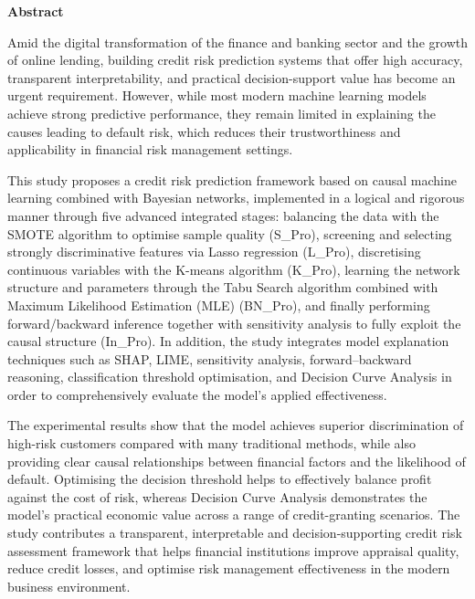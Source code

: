 \clearpage
{}
\vspace*{1cm}
\begin{center}
    \textbf{\fontsize{20}{24}\selectfont Abstract}
\end{center}
\vspace{1cm}

Amid the digital transformation of the finance and banking sector and the growth of online lending, building credit risk prediction systems that offer high accuracy, transparent interpretability, and practical decision-support value has become an urgent requirement. However, while most modern machine learning models achieve strong predictive performance, they remain limited in explaining the causes leading to default risk, which reduces their trustworthiness and applicability in financial risk management settings.

This study proposes a credit risk prediction framework based on causal machine learning combined with Bayesian networks, implemented in a logical and rigorous manner through five advanced integrated stages: balancing the data with the SMOTE algorithm to optimise sample quality (S\_Pro), screening and selecting strongly discriminative features via Lasso regression (L\_Pro), discretising continuous variables with the K-means algorithm (K\_Pro), learning the network structure and parameters through the Tabu Search algorithm combined with Maximum Likelihood Estimation (MLE) (BN\_Pro), and finally performing forward/backward inference together with sensitivity analysis to fully exploit the causal structure (In\_Pro). In addition, the study integrates model explanation techniques such as SHAP, LIME, sensitivity analysis, forward–backward reasoning, classification threshold optimisation, and Decision Curve Analysis in order to comprehensively evaluate the model's applied effectiveness.

The experimental results show that the model achieves superior discrimination of high-risk customers compared with many traditional methods, while also providing clear causal relationships between financial factors and the likelihood of default. Optimising the decision threshold helps to effectively balance profit against the cost of risk, whereas Decision Curve Analysis demonstrates the model's practical economic value across a range of credit-granting scenarios. The study contributes a transparent, interpretable and decision-supporting credit risk assessment framework that helps financial institutions improve appraisal quality, reduce credit losses, and optimise risk management effectiveness in the modern business environment.
\vspace*{\fill} %